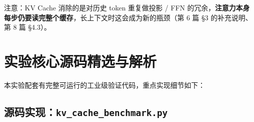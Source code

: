 注意：KV Cache 消除的是对历史 token 重复做投影 / FFN 的冗余，\textbf{注意力本身每步仍要读完整个缓存}，长上下文时这会成为新的瓶颈（第 6 篇 §3 的补充说明、第 8 篇 §4.3）。


\section{实验核心源码精选与解析}

本实验配套有完整可运行的工业级验证代码，重点实现细节如下：


\subsection{源码实现：\texttt{kv\_cache\_benchmark.py}}



